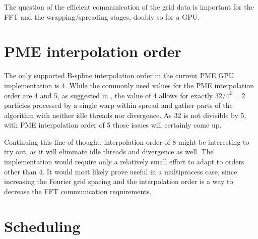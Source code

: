 \documentclass[12pt,a4paper]{report}
\begin{document}
The question of the efficient communication of the grid data is important for the FFT and the wrapping/spreading stages, doubly so for a GPU.
 
\section{PME interpolation order}
The only supported B-spline interpolation order in the current PME GPU implementation is 4. While the commonly used values for the PME interpolation order are 4 and 5, as suggested in \cite{spme}, the value of 4 allows for exactly $32/4^2 = 2$ particles processed by a single warp within spread and gather parts of the algorithm with neither idle threads nor divergence. As 32 is not divisible by 5, with PME interpolation order of 5 those issues will certainly come up.

Continuing this line of thought, interpolation order of 8 might be interesting to try out, as it will eliminate idle threads and divergence as well. The implementation would require only a relatively small effort to adapt to orders other than 4. It would most likely prove useful in a multiprocess case, since increasing the Fourier grid spacing and the interpolation order is a way to decrease the FFT communication requirements.

\section{Scheduling}
\end{document}
